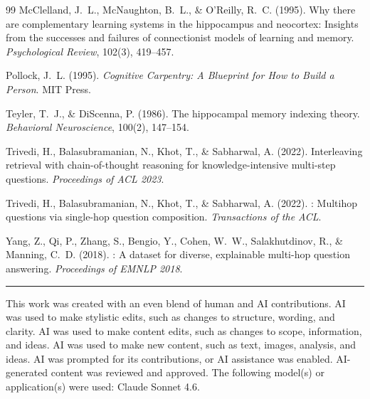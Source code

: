 \documentclass[11pt,a4paper]{article}
\begin{document}
\begin{thebibliography}{99}
McClelland, J.~L., McNaughton, B.~L., \& O'Reilly, R.~C. (1995).
\newblock Why there are complementary learning systems in the hippocampus
  and neocortex: Insights from the successes and failures of connectionist
  models of learning and memory.
\newblock \emph{Psychological Review}, 102(3), 419--457.

Pollock, J.~L. (1995).
\newblock \emph{Cognitive Carpentry: A Blueprint for How to Build a Person}.
\newblock MIT Press.

Teyler, T.~J., \& DiScenna, P. (1986).
\newblock The hippocampal memory indexing theory.
\newblock \emph{Behavioral Neuroscience}, 100(2), 147--154.

Trivedi, H., Balasubramanian, N., Khot, T., \& Sabharwal, A. (2022).
\newblock Interleaving retrieval with chain-of-thought reasoning for
  knowledge-intensive multi-step questions.
\newblock \emph{Proceedings of ACL 2023}.

Trivedi, H., Balasubramanian, N., Khot, T., \& Sabharwal, A. (2022).
: Multihop questions via single-hop question composition.
\newblock \emph{Transactions of the ACL}.

Yang, Z., Qi, P., Zhang, S., Bengio, Y., Cohen, W.~W., Salakhutdinov, R.,
  \& Manning, C.~D. (2018).
: A dataset for diverse, explainable multi-hop
  question answering.
\newblock \emph{Proceedings of EMNLP 2018}.

\end{thebibliography}


\bigskip
\noindent\rule{\linewidth}{0.4pt}


\noindent
This work was created with an even blend of human and AI contributions.
AI was used to make stylistic edits, such as changes to structure, wording, and clarity.
AI was used to make content edits, such as changes to scope, information, and ideas.
AI was used to make new content, such as text, images, analysis, and ideas.
AI was prompted for its contributions, or AI assistance was enabled.
AI-generated content was reviewed and approved.
The following model(s) or application(s) were used: Claude Sonnet 4.6.
\end{document}
